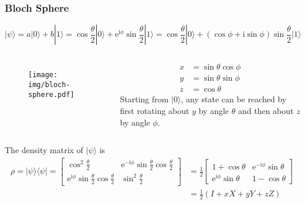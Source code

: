 \documentclass[UTF8,aspectratio=43,11pt,colorlinks,compress,openany]{beamer}%
\begin{document}
\begin{frame}\frametitle{Bloch Sphere}
\setlength\abovedisplayskip{0pt}
\setlength\belowdisplayskip{0pt}
\[|\psi\rangle=a|0\rangle+b|1\rangle=\cos\frac{\theta}{2}|0\rangle+\mathrm{e}^{\mathrm{i}\phi}\sin\frac{\theta}{2}|1\rangle=\cos\frac{\theta}{2}|0\rangle+(\cos\phi+\mathrm{i}\sin\phi)\sin\frac{\theta}{2}|1\rangle\]\vspace*{-2ex}
\begin{columns}
	\begin{figure}[H]
		\texttt{[image: img/bloch-sphere.pdf]}
	\end{figure}
\begin{align*}
	x&=\sin\theta\cos\phi\\
	y&=\sin\theta\sin\phi\\
	z&=\cos\theta
\end{align*}
Starting from $|0\rangle$, any state can be reached by first rotating about $y$ by angle $\theta$ and then about $z$ by angle $\phi$.
\end{columns}
The density matrix of $|\psi\rangle$ is
\begin{align*}
\rho=|\psi\rangle\langle\psi|=
\begin{bmatrix}
	\cos^2\frac{\theta}{2} &\mathrm{e}^{-\mathrm{i}\phi}\sin\frac{\theta}{2}\cos\frac{\theta}{2}\\
	\mathrm{e}^{\mathrm{i}\phi}\sin\frac{\theta}{2}\cos\frac{\theta}{2} &\sin^2\frac{\theta}{2}
\end{bmatrix}&=\frac{1}{2}
\begin{bmatrix}
	1+\cos\theta &\mathrm{e}^{-\mathrm{i}\phi}\sin\theta\\
	\mathrm{e}^{\mathrm{i}\phi}\sin\theta &1-\cos\theta
\end{bmatrix}\\&=\frac{1}{2}(I+xX+yY+zZ)
\end{align*}
\end{frame}
\end{document}
